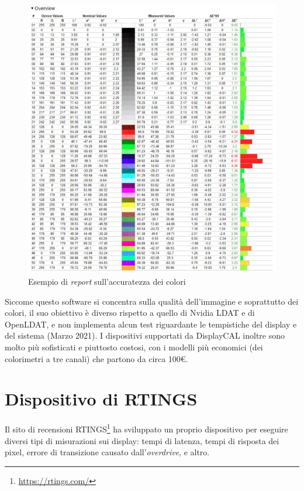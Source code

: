 \begin{figure}[h]
	\centering
	\includegraphics[width=\textwidth]{StatoDellArte_files/displaycal_report_example.jpg}
	\caption{Esempio di \textit{report} sull'accuratezza dei colori}
	\label{fig:displaycal_report_example}
\end{figure}

Siccome questo software si concentra sulla qualità dell'immagine e soprattutto dei colori, il suo obiettivo è diverso rispetto a quello di Nvidia LDAT e di OpenLDAT, e non implementa alcun test riguardante le tempistiche del display e del sistema (Marzo 2021). I dispositivi supportati da DisplayCAL inoltre sono molto più sofisticati e piuttosto costosi, con i modelli più economici (dei colorimetri a tre canali) che partono da circa 100€.

\section{Dispositivo di RTINGS}
Il sito di recensioni RTINGS\footnote{\href{https://rtings.com/}{https://rtings.com/}} ha sviluppato un proprio dispositivo per eseguire diversi tipi di misurazioni sui display: tempi di latenza, tempi di risposta dei pixel, errore di transizione causato dall'\textit{overdrive}, e altro.

